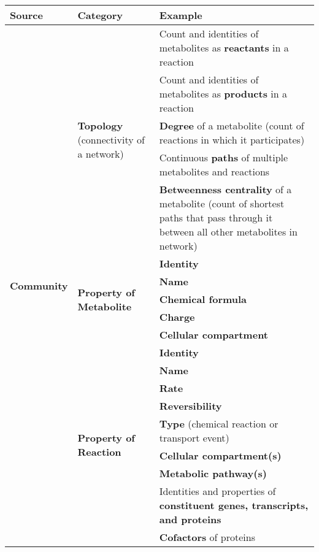 
\begin{table}[htbp]
\small
\centering
\begin{tabular}{ |m{2cm}|m{4cm}|m{10cm}| }


\hline
\textbf{Source}
& \textbf{Category}
& \textbf{Example}



\\ \hline
\multirow{19}{2cm}{\textbf{Community}}
& \multirow{5}{4cm}{\textbf{Topology} (connectivity of a network)}
& Count and identities of metabolites as \textbf{reactants} in a reaction
\\ \cline{3-3}
& & Count and identities of metabolites as \textbf{products} in a reaction
\\ \cline{3-3}
& & \textbf{Degree} of a metabolite (count of reactions in which it participates)
\\ \cline{3-3}
& & Continuous \textbf{paths} of multiple metabolites and reactions
\\ \cline{3-3}
& & \textbf{Betweenness centrality} of a metabolite (count of shortest paths that pass through it between all other metabolites in network)


\\ \cline{2-3}
& \multirow{5}{4cm}{\textbf{Property of Metabolite}}
& \textbf{Identity}
\\ \cline{3-3}
& & \textbf{Name}
\\ \cline{3-3}
& & \textbf{Chemical formula}
\\ \cline{3-3}
& & \textbf{Charge}
\\ \cline{3-3}
& & \textbf{Cellular compartment}


\\ \cline{2-3}
& \multirow{9}{4cm}{\textbf{Property of Reaction}}
& \textbf{Identity}
\\ \cline{3-3}
& & \textbf{Name}
\\ \cline{3-3}
& & \textbf{Rate}
\\ \cline{3-3}
& & \textbf{Reversibility}
\\ \cline{3-3}
& & \textbf{Type} (chemical reaction or transport event)
\\ \cline{3-3}
& & \textbf{Cellular compartment(s)}
\\ \cline{3-3}
& & \textbf{Metabolic pathway(s)}
\\ \cline{3-3}
& & Identities and properties of \textbf{constituent genes, transcripts, and proteins}
\\ \cline{3-3}
& & \textbf{Cofactors} of proteins


\end{tabular}
\end{table}
